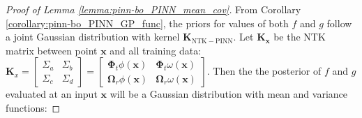 \begin{proof} [Proof of Lemma \ref{lemma:pinn-bo_PINN_mean_cov}]
From Corollary \ref{corollary:pinn-bo_PINN_GP_func}, the priors for values of both $f$ and $g$ follow a joint Gaussian distribution with kernel $\mathbf{K}_\mathrm{NTK-PINN}$. Let $\mathbf{K_x}$ be the NTK matrix between point $\mathbf{x}$ and all training data: $\mathbf{K}_x = \begin{bmatrix}
        \Sigma_a & \Sigma_b \\
        \Sigma_c & \Sigma_d
    \end{bmatrix} =\begin{bmatrix}
         \boldsymbol{\Phi}_t \phi(\mathbf{x}) & 
         \boldsymbol{\Phi}_t \omega(\mathbf{x}) \\
         \boldsymbol{\Omega}_r\phi(\mathbf{x}) &
          \boldsymbol{\Omega}_r  \omega(\mathbf{x})  \end{bmatrix}$. 
Then the the posterior of $f$ and $g$ evaluated at an input $\mathbf{x}$ will be a Gaussian distribution with mean and variance functions:

\end{proof}
